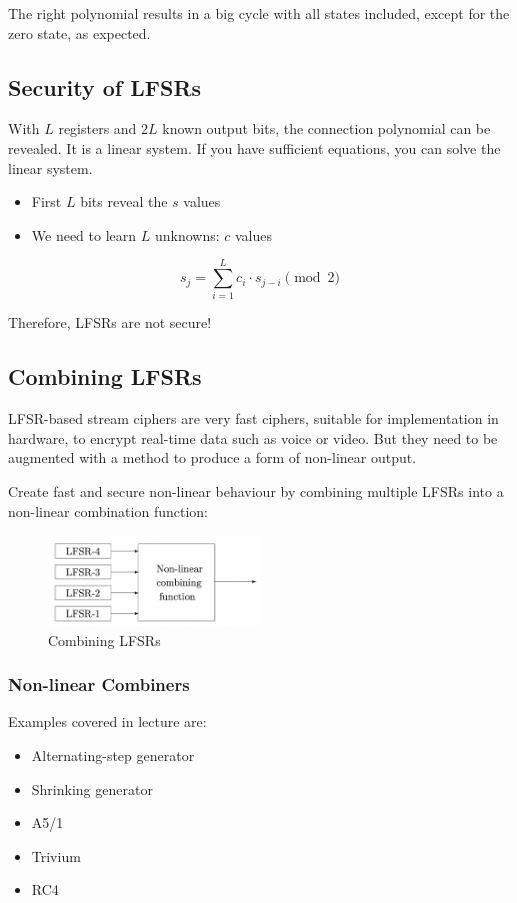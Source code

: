 The right polynomial results in a big cycle with all states included, except for the zero state, as expected.

\subsection{Security of LFSRs}
With $L$ registers and $2L$ known output bits, the connection polynomial can be revealed. It is a linear system. If you have sufficient equations, you can solve the linear system.
\begin{itemize}
    \item First $L$ bits reveal the $s$ values
    \item We need to learn $L$ unknowns: $c$ values
\end{itemize}

\[ s_j = \sum^L_{i=1} c_i \cdot s_{j-i} \pmod{2} \]

Therefore, LFSRs are not secure!


\subsection{Combining LFSRs}
LFSR-based stream ciphers are very fast ciphers, suitable for implementation in hardware, to encrypt real-time data such as voice or video. But they need to be augmented with a method to produce a form of non-linear output.

Create fast and secure non-linear behaviour by combining multiple LFSRs into a non-linear combination function: 

\begin{figure}[h!]
    \centering
    \includegraphics[width=0.5\textwidth]{img/combinelfsr.png}
    \caption{Combining LFSRs}
\end{figure}

\subsubsection{Non-linear Combiners}
Examples covered in lecture are:
\begin{itemize}
    \item Alternating-step generator
    \item Shrinking generator
    \item A5/1
    \item Trivium
    \item RC4
\end{itemize}
